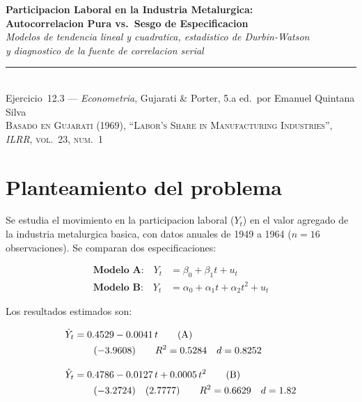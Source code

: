 \documentclass[12pt, letterpaper]{article}
\begin{document}
\begin{center}
  {\LARGE\bfseries Participacion Laboral en la Industria Metalurgica:}\\[6pt]
  {\LARGE\bfseries Autocorrelacion Pura vs.\ Sesgo de Especificacion}\\[12pt]
  {\large\itshape Modelos de tendencia lineal y cuadratica, estadistico de Durbin-Watson}\\
  {\large\itshape y diagnostico de la fuente de correlacion serial}\\[14pt]
  \rule{0.55\linewidth}{0.6pt}\\[8pt]
  {\normalsize Ejercicio~12.3 --- \textit{Econometria}, Gujarati \& Porter, 5.a ed.\
  por Emanuel Quintana Silva}\\[4pt]
  {\small\textsc{Basado en Gujarati (1969), ``Labor's Share in Manufacturing Industries'',
  \textit{ILRR}, vol.~23, num.~1}}
\end{center}

\vspace{10pt}

\section{Planteamiento del problema}

Se estudia el movimiento en la participacion laboral ($Y_t$) en el valor agregado
de la industria metalurgica basica, con datos anuales de 1949 a 1964 ($n = 16$
observaciones). Se comparan dos especificaciones:

\begin{align}
  \textbf{Modelo A:} \quad
    Y_t &= \beta_0 + \beta_1 t + u_t
  \label{eq:modA}\\[6pt]
  \textbf{Modelo B:} \quad
    Y_t &= \alpha_0 + \alpha_1 t + \alpha_2 t^2 + u_t
  \label{eq:modB}
\end{align}

Los resultados estimados son:

\begin{align}
  \hat Y_t &= 0.4529 - 0.0041\,t
  \tag{A}\label{eq:estA}\\
  &\quad\quad (-3.9608) \qquad R^2 = 0.5284 \quad d = 0.8252 \notag\\[8pt]
  \hat Y_t &= 0.4786 - 0.0127\,t + 0.0005\,t^2
  \tag{B}\label{eq:estB}\\
  &\quad\quad (-3.2724)\quad (2.7777) \qquad R^2 = 0.6629 \quad d = 1.82 \notag
\end{align}
\end{document}
